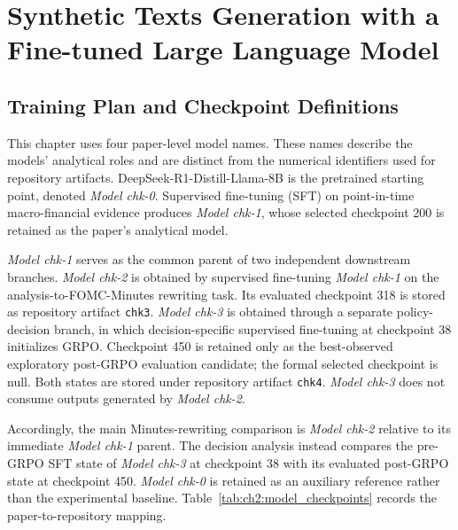 \graphicspath{{Chapter2/Chapter2Figs/}{Chapter2/Chapter2Figs/}}
 
\chapter{Synthetic Texts Generation with a Fine-tuned Large Language Model}\label{ch:chapter:2}










\section{Training Plan and Checkpoint Definitions}\label{ch2:sec:training-plan}

This chapter uses four paper-level model names. These names describe the
models' analytical roles and are distinct from the numerical identifiers used
for repository artifacts. DeepSeek-R1-Distill-Llama-8B is the pretrained
starting point, denoted \textit{Model chk-0}. Supervised fine-tuning (SFT) on
point-in-time macro-financial evidence produces \textit{Model chk-1}, whose
selected checkpoint 200 is retained as the paper's analytical model.

\textit{Model chk-1} serves as the common parent of two independent downstream
branches. \textit{Model chk-2} is obtained by supervised fine-tuning
\textit{Model chk-1} on the analysis-to-FOMC-Minutes rewriting task. Its
evaluated checkpoint 318 is stored as repository artifact \texttt{chk3}.
\textit{Model chk-3} is obtained through a separate policy-decision branch, in
which decision-specific supervised fine-tuning at checkpoint 38 initializes
GRPO. Checkpoint 450 is retained only as the best-observed exploratory
post-GRPO evaluation candidate; the formal selected checkpoint is null. Both
states are stored under repository artifact \texttt{chk4}. \textit{Model chk-3} does not
consume outputs generated by \textit{Model chk-2}.

Accordingly, the main Minutes-rewriting comparison is \textit{Model chk-2}
relative to its immediate \textit{Model chk-1} parent. The decision analysis
instead compares the pre-GRPO SFT state of \textit{Model chk-3} at checkpoint
38 with its evaluated post-GRPO state at checkpoint 450. \textit{Model chk-0}
is retained as an auxiliary reference rather than the experimental baseline.
Table~\ref{tab:ch2:model_checkpoints} records the paper-to-repository mapping.

